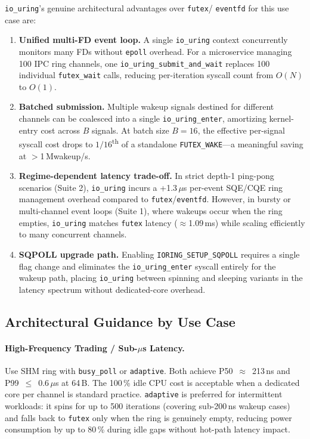 \documentclass[10pt,conference]{IEEEtran}
\begin{document}
\texttt{io\_uring}'s genuine architectural advantages over \texttt{futex}/
\texttt{eventfd} for this use case are:
\begin{enumerate}
  \item \textbf{Unified multi-FD event loop.}  A single \texttt{io\_uring}
        context concurrently monitors many FDs without \texttt{epoll} overhead.
        For a microservice managing 100 IPC ring channels, one
        \texttt{io\_uring\_submit\_and\_wait} replaces 100 individual
        \texttt{futex\_wait} calls, reducing per-iteration syscall count from
        $O(N)$ to $O(1)$.
  \item \textbf{Batched submission.}  Multiple wakeup signals destined for
        different channels can be coalesced into a single
        \texttt{io\_uring\_enter}, amortizing kernel-entry cost across $B$
        signals.  At batch size $B=16$, the effective per-signal syscall cost
        drops to $1/16$\textsuperscript{th} of a standalone
        \texttt{FUTEX\_WAKE}---a meaningful saving at $>$1\,Mwakeup/s.
  \item \textbf{Regime-dependent latency trade-off.}  In strict depth-1 ping-pong
        scenarios (Suite 2), \texttt{io\_uring} incurs a +1.3\,$\mu$s per-event SQE/CQE ring
        management overhead compared to \texttt{futex}/\texttt{eventfd}. However, in bursty or
        multi-channel event loops (Suite 1), where wakeups occur when the ring empties,
        \texttt{io\_uring} matches \texttt{futex} latency ($\approx$1.09\,ms) while scaling
        efficiently to many concurrent channels.
  \item \textbf{SQPOLL upgrade path.}  Enabling
        \texttt{IORING\-\_SETUP\-\_SQPOLL}
        requires a single flag change and eliminates the
        \texttt{io\-\_uring\-\_enter} syscall entirely for the wakeup path,
        placing \texttt{io\_uring} between spinning and sleeping variants in
        the latency spectrum without dedicated-core overhead.
\end{enumerate}

\subsection{Architectural Guidance by Use Case}

\paragraph{High-Frequency Trading / Sub-$\mu$s Latency.}
Use SHM ring with \texttt{busy\_poll} or \texttt{adaptive}.  Both achieve
P50~$\approx$~213\,ns and P99~$\leq$~0.6\,$\mu$s at 64\,B.  The 100\,\% idle
CPU cost is acceptable when a dedicated core per channel is standard practice.
\texttt{adaptive} is preferred for intermittent workloads: it spins for up to
500 iterations (covering sub-200\,ns wakeup cases) and falls back to
\texttt{futex} only when the ring is genuinely empty, reducing power
consumption by up to 80\,\% during idle gaps without hot-path latency impact.
\end{document}

